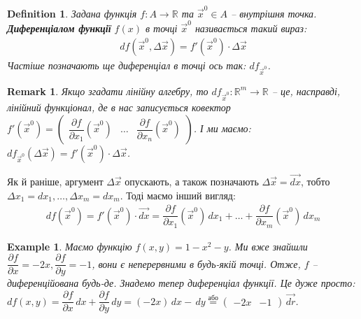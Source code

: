 \documentclass[a4paper, 10pt]{article}
\def\departial#1#2{\dfrac{\partial {#1}}{\partial {#2}}}
\theoremstyle{theoremdd}
\theoremstyle{theoremdd}
\theoremstyle{theoremdd}
\newtheorem{definition}[theorem]{Definition}
\theoremstyle{theoremdd}
\theoremstyle{theoremdd}
\newtheorem{example}[theorem]{Example}
\theoremstyle{theoremdd}
\theoremstyle{theoremdd}
\newtheorem{remark}[theorem]{Remark}
\theoremstyle{theoremdd}
\theoremstyle{theoremdd}
\begin{document}
\begin{definition}
Задана функція $f\colon A \to \mathbb{R}$ та $\vec{x}^0 \in A$ -- внутрішня точка.\\
\textbf{Диференціалом функції} $f(x)$ в точці $\vec{x}^0$ називається такий вираз:
\begin{align*}
df(\vec{x}^0, \Delta \vec{x}) = f'(\vec{x}^0) \cdot \Delta \vec{x}
\end{align*}
Частіше позначають ще диференціал в точці ось так: $df_{\vec{x}^0}$.
\end{definition}

\begin{remark}
Якщо згадати лінійну алгебру, то $df_{\vec{x}^0} \colon \mathbb{R}^m \to \mathbb{R}$ -- це, насправді, лінійний функціонал, де в нас записується ковектор $f'(\vec{x}^0) = \begin{pmatrix}
\departial{f}{x_1}(\vec{x}^0) & \dots & \departial{f}{x_n}(\vec{x}^0)
\end{pmatrix}$. І ми маємо:\\
$df_{\vec{x}^0} (\Delta \vec{x}) = f'(\vec{x}^0) \cdot \Delta \vec{x}$.
\end{remark}

Як й раніше, аргумент $\Delta \vec{x}$ опускають, а також позначають $\Delta \vec{x}= \vec{dx}$, тобто $\Delta x_1 = dx_1, \dots, \Delta x_m = dx_m$. Тоді маємо інший вигляд:
\begin{align*}
df(\vec{x}^0) = f'(\vec{x}^0) \cdot \vec{dx} = \departial{f}{x_1}(\vec{x}^0)\,dx_1 + \dots + \departial{f}{x_m}(\vec{x}^0)\,dx_m
\end{align*}

\begin{example}
Маємо функцію $f(x,y) = 1-x^2 - y$. Ми вже знайшли $\departial{f}{x} = -2x, \departial{f}{y} = -1$, вони є неперервними в будь-якій точці. Отже, $f$ -- диференційована будь-де. Знадемо тепер диференціал функції. Це дуже просто:\\
$d f(x,y) = \departial{f}{x}\,dx + \departial{f}{y}\,dy = (-2x)\,dx -\,dy \overset{\text{або}}{=} \begin{pmatrix}
-2x & -1
\end{pmatrix} \, \vec{dr}$.
\end{example}
\end{document}
